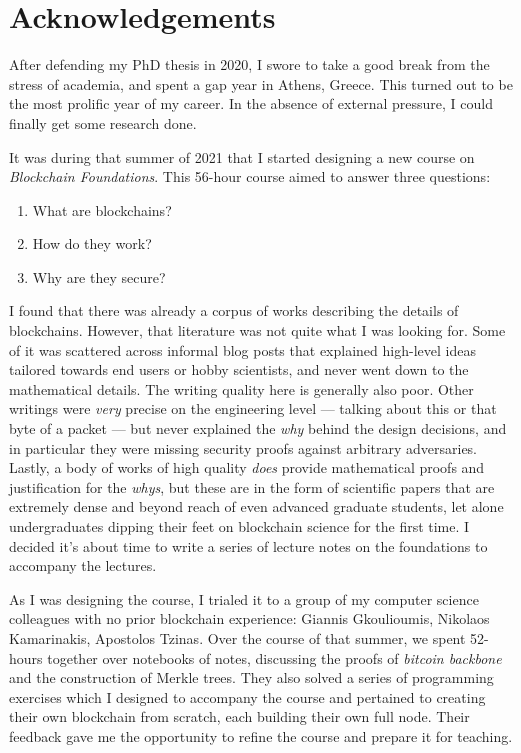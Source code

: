 \section{Acknowledgements}

After defending my PhD thesis in 2020, I swore to take a good break
from the stress of academia, and spent a gap year in Athens, Greece.
This turned out to be the most prolific year of my career. In the absence
of external pressure, I could finally get some research done.

It was during that summer of 2021 that I started designing a new course on
\emph{Blockchain Foundations}. This 56-hour course aimed to answer
three questions:

\begin{enumerate}
  \item What are blockchains?
  \item How do they work?
  \item Why are they secure?
\end{enumerate}

I found that there was already a corpus of works describing the
details of blockchains. However, that literature was not quite what
I was looking for. Some of it was scattered across informal blog posts
that explained high-level ideas tailored towards end users or
hobby scientists, and never went down to the mathematical details.
The writing quality here is generally also poor.
Other writings were \emph{very} precise on the engineering level
--- talking about this or that byte of a packet --- but never explained
the \emph{why} behind the design decisions, and in particular they
were missing security proofs against arbitrary adversaries.
Lastly, a body of works of high quality \emph{does} provide mathematical
proofs and justification
for the \emph{whys}, but these are in the form of scientific papers
that are extremely dense and beyond reach of even advanced graduate
students, let alone undergraduates dipping their feet on blockchain
science for the first time. I decided it's about time to write a
series of lecture notes on the foundations to accompany the lectures.

As I was designing the course, I trialed it to a group of my computer
science colleagues with no prior blockchain experience:
Giannis Gkoulioumis, Nikolaos Kamarinakis, Apostolos Tzinas.
Over the course of that summer, we spent 52-hours together over notebooks
of notes, discussing the proofs of \emph{bitcoin backbone} and the
construction of Merkle trees. They also solved a series of programming
exercises which I designed to accompany the course and pertained to
creating their own blockchain from scratch, each building their own
full node. Their feedback gave me the opportunity to refine the course
and prepare it for teaching.


